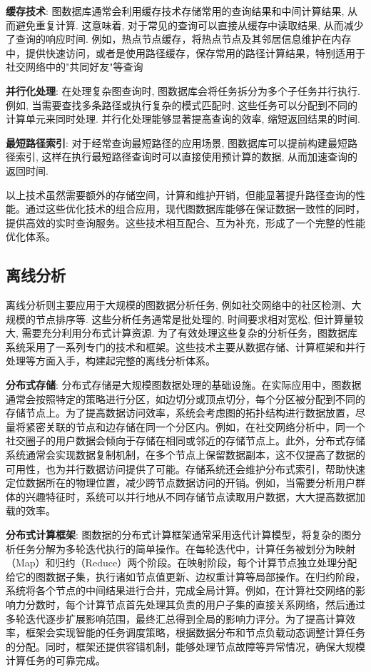 \documentclass[12pt,hyperref,a4paper,UTF8]{ctexart}
\begin{document}
\textbf{缓存技术}: 图数据库通常会利用缓存技术存储常用的查询结果和中间计算结果, 从而避免重复计算. 这意味着, 对于常见的查询可以直接从缓存中读取结果, 从而减少了查询的响应时间. 例如，热点节点缓存，将热点节点及其邻居信息维护在内存中，提供快速访问，或者是使用路径缓存，保存常用的路径计算结果，特别适用于社交网络中的"共同好友"等查询


\textbf{并行化处理}: 在处理复杂图查询时, 图数据库会将任务拆分为多个子任务并行执行. 例如, 当需要查找多条路径或执行复杂的模式匹配时, 这些任务可以分配到不同的计算单元来同时处理. 并行化处理能够显著提高查询的效率, 缩短返回结果的时间.

\textbf{最短路径索引}: 对于经常查询最短路径的应用场景, 图数据库可以提前构建最短路径索引, 这样在执行最短路径查询时可以直接使用预计算的数据, 从而加速查询的返回时间.

以上技术虽然需要额外的存储空间，计算和维护开销，但能显著提升路径查询的性能。通过这些优化技术的组合应用，现代图数据库能够在保证数据一致性的同时，提供高效的实时查询服务。这些技术相互配合、互为补充，形成了一个完整的性能优化体系。

\subsection{离线分析}

离线分析则主要应用于大规模的图数据分析任务, 例如社交网络中的社区检测、大规模的节点排序等. 这些分析任务通常是批处理的, 时间要求相对宽松, 但计算量较大, 需要充分利用分布式计算资源. 为了有效处理这些复杂的分析任务，图数据库系统采用了一系列专门的技术和框架。这些技术主要从数据存储、计算框架和并行处理等方面入手，构建起完整的离线分析体系。

\textbf{分布式存储}: 分布式存储是大规模图数据处理的基础设施。在实际应用中，图数据通常会按照特定的策略进行分区，如边切分或顶点切分，每个分区被分配到不同的存储节点上。为了提高数据访问效率，系统会考虑图的拓扑结构进行数据放置，尽量将紧密关联的节点和边存储在同一个分区内。例如，在社交网络分析中，同一个社交圈子的用户数据会倾向于存储在相同或邻近的存储节点上。此外，分布式存储系统通常会实现数据复制机制，在多个节点上保留数据副本，这不仅提高了数据的可用性，也为并行数据访问提供了可能。存储系统还会维护分布式索引，帮助快速定位数据所在的物理位置，减少跨节点数据访问的开销。例如，当需要分析用户群体的兴趣特征时，系统可以并行地从不同存储节点读取用户数据，大大提高数据加载的效率。

\textbf{分布式计算框架}: 图数据的分布式计算框架通常采用迭代计算模型，将复杂的图分析任务分解为多轮迭代执行的简单操作。在每轮迭代中，计算任务被划分为映射（Map）和归约（Reduce）两个阶段。在映射阶段，每个计算节点独立处理分配给它的图数据子集，执行诸如节点值更新、边权重计算等局部操作。在归约阶段，系统将各个节点的中间结果进行合并，完成全局计算。例如，在计算社交网络的影响力分数时，每个计算节点首先处理其负责的用户子集的直接关系网络，然后通过多轮迭代逐步扩展影响范围，最终汇总得到全局的影响力评分。为了提高计算效率，框架会实现智能的任务调度策略，根据数据分布和节点负载动态调整计算任务的分配。同时，框架还提供容错机制，能够处理节点故障等异常情况，确保大规模计算任务的可靠完成。
\end{document}
